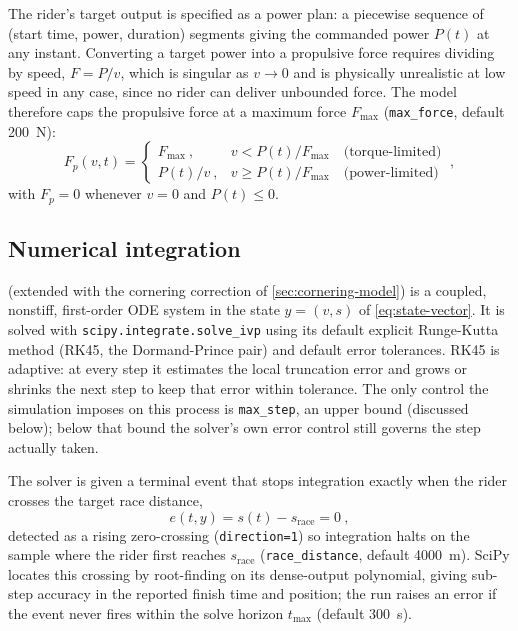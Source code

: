 The rider's target output is specified as a power plan: a piecewise sequence of
(start time, power, duration) segments giving the commanded power $P(t)$ at any
instant. Converting a target power into a propulsive force
requires dividing by speed, $F = P/v$, which is singular as $v \to 0$ and is
physically unrealistic at low speed in any case, since no rider can deliver
unbounded force. The model therefore caps the propulsive force at a maximum
force $F_{\max}$ (\nolinkurl{max_force}, default \SI{200}{\newton}):
\begin{equation}
    F_p(v, t) =
    \begin{cases}
        F_{\max}\ , & v < P(t) / F_{\max} \quad \text{(torque-limited)} \\[4pt]
        P(t) / v\ , & v \geq P(t) / F_{\max} \quad \text{(power-limited)}
    \end{cases}\ ,
    \label{eq:propulsive-force}
\end{equation}
with $F_p = 0$ whenever $v = 0$ and $P(t) \leq 0$.

\subsection{Numerical integration}
\label{sec:numerical-integration}

 (extended with the cornering correction of
\cref{sec:cornering-model}) is a coupled, nonstiff, first-order ODE system in the
state $y=(v,s)$ of \cref{eq:state-vector}. It is solved with
\nolinkurl{scipy.integrate.solve_ivp} using its default explicit Runge-Kutta method
(RK45, the Dormand-Prince pair) and default error tolerances. RK45 is adaptive:
at every step it estimates the local truncation error and grows or shrinks the
next step to keep that error within tolerance. The only control the simulation
imposes on this process is \nolinkurl{max_step}, an upper bound (discussed
below); below that bound the solver's own error control still governs the step
actually taken.

The solver is given a terminal event that stops integration exactly when the
rider crosses the target race distance,
\begin{equation}
    e(t, y) = s(t) - s_{\mathrm{race}} = 0\ ,
    \label{eq:race-distance-event}
\end{equation}
detected as a rising zero-crossing (\nolinkurl{direction=1}) so integration halts on
the sample where the rider first reaches $s_{\mathrm{race}}$
(\nolinkurl{race_distance}, default \SI{4000}{\metre}). SciPy locates this crossing
by root-finding on its dense-output polynomial, giving sub-step accuracy in the
reported finish time and position; the run raises an error if the event never
fires within the solve horizon $t_{\max}$ (default \SI{300}{\second}).

